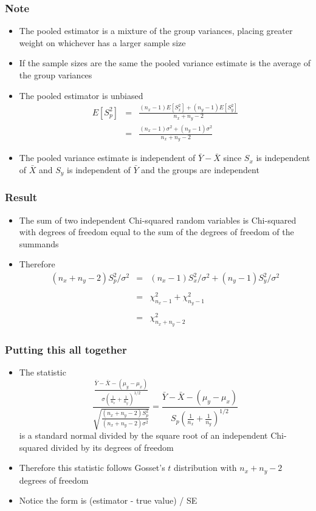 \documentclass[aspectratio=169]{beamer}
\begin{document}
\begin{frame}\frametitle{Note}
  \begin{itemize}
  \item The pooled estimator is a mixture of the group variances,
    placing greater weight on whichever has a larger sample size
  \item If the sample sizes are the same the pooled variance estimate is 
    the average of the group variances
  \item The pooled estimator is unbiased
    \begin{eqnarray*}
    E[S_p^2] & = & \frac{(n_x - 1) E[S_x^2] + (n_y - 1) E[S_y^2]}{n_x + n_y - 2}\\
            & = & \frac{(n_x - 1)\sigma^2 + (n_y - 1)\sigma^2}{n_x + n_y - 2}
    \end{eqnarray*}
  \item The pooled variance  estimate is independent of $\bar Y - \bar X$ 
    since $S_x$ is independent of $\bar X$ and $S_y$ is independent of $\bar Y$
    and the groups are independent
  \end{itemize}
\end{frame}

\begin{frame}\frametitle{Result}
  \begin{itemize}
  \item The sum of two independent Chi-squared random variables is
    Chi-squared with degrees of freedom equal to the sum of the degrees
    of freedom of the summands
  \item Therefore
    \begin{eqnarray*}
      (n_x + n_y - 2) S_p^2 / \sigma^2 & = & (n_x - 1)S_x^2 /\sigma^2 + (n_y - 1)S_y^2/\sigma^2 \\ \\
      & = & \chi^2_{n_x - 1} + \chi^2_{n_y-1} \\ \\
      & = & \chi^2_{n_x + n_y - 2}
    \end{eqnarray*}
  \end{itemize}
\end{frame}

\begin{frame}\frametitle{Putting this all together}
  \begin{itemize}
  \item The statistic
    $$
    \frac{\frac{\bar Y - \bar X - (\mu_y - \mu_x)}{\sigma \left(\frac{1}{n_x} + \frac{1}{n_y}\right)^{1/2}}}%
    {\sqrt{\frac{(n_x + n_y - 2) S_p^2}{(n_x + n_y - 2)\sigma^2}}}
    = \frac{\bar Y - \bar X - (\mu_y - \mu_x)}{S_p \left(\frac{1}{n_x} + \frac{1}{n_y}\right)^{1/2}}
    $$
    is a standard normal divided by the square root of an independent Chi-squared divided by its degrees of freedom 
  \item Therefore this statistic follows Gosset's $t$ distribution with
    $n_x + n_y - 2$ degrees of freedom
  \item Notice the form is (estimator - true value) / SE
  \end{itemize}
\end{frame}
\end{document}
